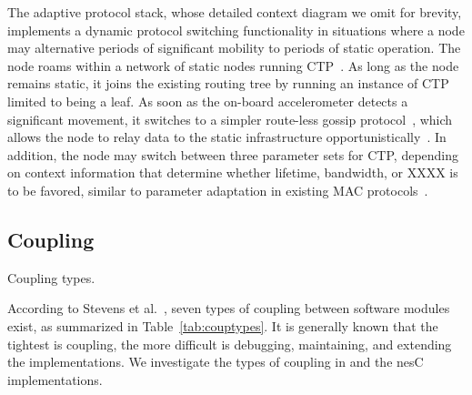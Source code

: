 The adaptive protocol stack, whose detailed context diagram we omit
for brevity, implements a dynamic protocol switching functionality in
situations where a node may alternative periods of significant
mobility to periods of static operation. The node roams within a
network of static nodes running CTP~\cite{CTP}. As long as the node
remains static, it joins the existing routing tree by running an
instance of CTP limited to being a leaf. As soon as the on-board
accelerometer detects a significant movement, it switches to a simpler
route-less gossip protocol~\cite{gossip}, which allows the node to
relay data to the static infrastructure
opportunistically~\cite{smarthop}. In addition, the node may switch
between three parameter sets for CTP, depending on context information
that determine whether lifetime, bandwidth, or XXXX is to be
favored, similar to parameter adaptation in existing MAC
protocols~\cite{zimmerling12}.



\subsection{Coupling}\label{sec:evalcomp}

\begin{table}[!tb]
\renewcommand{\arraystretch}{1.3}
\caption{Coupling types.}
\label{tab:couptypes}

\end{table}

According to Stevens et al.~\cite{stevens79}, seven types of coupling
between software modules exist, as summarized in
Table~\ref{tab:couptypes}. It is generally known that the tightest is
coupling, the more difficult is debugging, maintaining, and extending
the implementations. %
We investigate the types of coupling in \conesc and the nesC
implementations.

